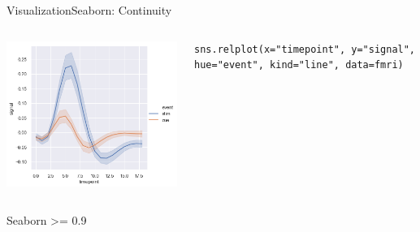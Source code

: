 \documentclass[10pt,compress]{beamer} %
\begin{document}
\begin{frame}[fragile]{Visualization}{Seaborn: Continuity}
\begin{columns}
		\includegraphics[width=\textwidth]{figs/sns-line2.png}\\
		\begin{exampleblock}{\footnotesize{}}
		\vspace{-0.2cm} 
		\begin{lstlisting}[basicstyle=\tiny]
		sns.relplot(x="timepoint", y="signal", hue="event", kind="line", data=fmri)
		\end{lstlisting}
		\vspace{-0.2cm} 
		\end{exampleblock}
	\end{columns}
	Seaborn >= 0.9
\end{frame}
\end{document}

